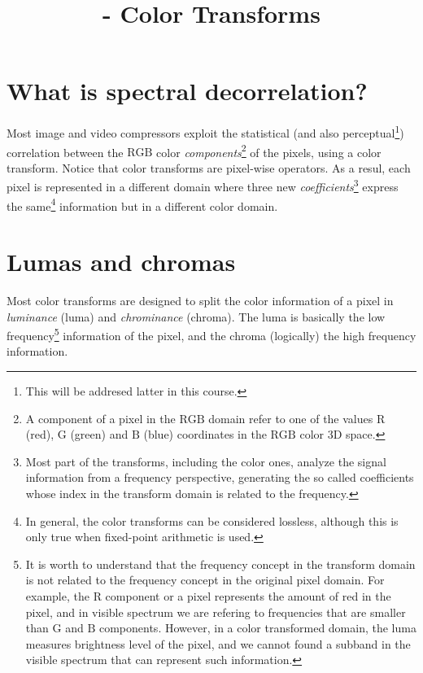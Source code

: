 

\title{\SM{} - Color Transforms}

\maketitle
\tableofcontents

\section{What is spectral decorrelation?}

Most image and video compressors exploit the statistical (and also
perceptual\footnote{This will be addresed latter in this course.})
correlation between the $\text{RGB}$ color
\emph{components}\footnote{A component of a pixel in the $\text{RGB}$
domain refer to one of the values $\text{R}$ (red), $\text{G}$ (green)
and $\text{B}$ (blue) coordinates in the $\text{RGB}$ color 3D space.}
of the pixels, using a color transform. Notice that color transforms
are pixel-wise operators. As a resul, each pixel is represented in a
different domain where three new \emph{coefficients}\footnote{Most
part of the transforms, including the color ones, analyze the signal
information from a frequency perspective, generating the so called
coefficients whose index in the transform domain is related to the
frequency.} express the same\footnote{In general, the color transforms
can be considered lossless, although this is only true when
fixed-point arithmetic is used.} information but in a different color
domain.

\section{Lumas and chromas}

Most color transforms are designed to split the color information of a
pixel in \emph{luminance} (luma) and \emph{chrominance} (chroma). The
luma is basically the low frequency\footnote{It is worth to understand
that the frequency concept in the transform domain is not related to
the frequency concept in the original pixel domain. For example, the
$\text{R}$ component or a pixel represents the amount of red in the pixel, and in
visible spectrum we are refering to frequencies that are smaller than
$\text{G}$ and $\text{B}$ components. However, in a color transformed
domain, the luma measures brightness level of the pixel, and we cannot
found a subband in the visible spectrum that can represent such
information.} information of the pixel, and the chroma (logically)
the high frequency information.

